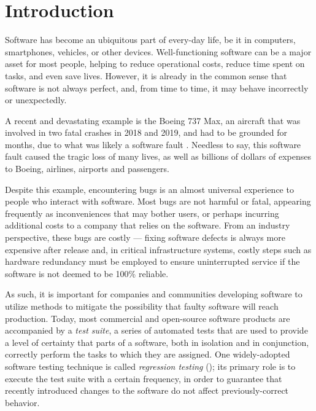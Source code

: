 \chapter{Introduction}\label{chap:intro}

Software has become an ubiquitous part of every-day life, be it in computers, smartphones, vehicles, or other devices.
Well-functioning software can be a major asset for most people, helping to reduce operational costs, reduce time spent on tasks, and even save lives.
However, it is already in the common sense that software is not always perfect, and, from time to time, it may behave incorrectly or unexpectedly.

A recent and devastating example is the Boeing 737 Max, an aircraft that was involved in two fatal crashes in 2018 and 2019, and had to be grounded for months, due to what was likely a software fault \cite{levin_latest_2019}.
Needless to say, this software fault caused the tragic loss of many lives, as well as billions of dollars of expenses to Boeing, airlines, airports and passengers.

Despite this example, encountering bugs is an almost universal experience to people who interact with software.
Most bugs are not harmful or fatal, appearing frequently as inconveniences that may bother users, or perhaps incurring additional costs to a company that relies on the software.
From an industry perspective, these bugs are costly --- fixing software defects is always more expensive after release and, in critical infrastructure systems, costly steps such as hardware redundancy must be employed to ensure uninterrupted service if the software is not deemed to be 100\% reliable.

As such, it is important for companies and communities developing software to utilize methods to mitigate the possibility that faulty software will reach production.
Today, most commercial and open-source software products are accompanied by a \textit{test suite}, a series of automated tests that are used to provide a level of certainty that parts of a software, both in isolation and in conjunction, correctly perform the tasks to which they are assigned.
One widely-adopted software testing technique is called \textit{regression testing} (\rt); its primary role is to execute the test suite with a certain frequency, in order to guarantee that recently introduced changes to the software do not affect previously-correct behavior.


